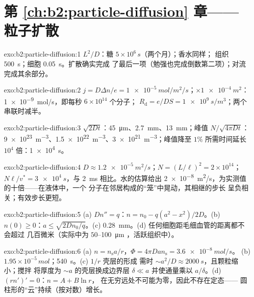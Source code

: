 \section*{第 \ref{ch:b2:particle-diffusion} 章——粒子扩散}

\begin{solution}{exo:b2:particle-diffusion:1}
$L^2/D$：糖 $5 \times 10^6\,\unit{s}$（两个月）；香水同样；
组织 \qty{500}{s}；细胞 \qty{0.05}{s}。扩散确实完成
了最后一项（勉强也完成倒数第二项）；对流完成其余部分。
\end{solution}

\begin{solution}{exo:b2:particle-diffusion:2}
$j = D\Delta n/e = \qty{1e-5}{mol/m^2/s}$；$\times \qty{1e-4}{m^2}$：
\qty{1e-9}{mol/s}，即每秒 $6 \times 10^{14}$ 个分子；
$R_{\text{d}} = e/DS = \qty{1e9}{s/m^3}$；两个串联时减半。
\end{solution}

\begin{solution}{exo:b2:particle-diffusion:3}
$\sqrt{2Dt}$：\qty{45}{\micro m}、\qty{2.7}{mm}、\qty{13}{mm}；峰值 $N/\sqrt{4\pi
Dt}$：\qty{9e23}{m^{-3}}、\qty{1.5e22}{m^{-3}}、\qty{3e21}{m^{-3}}；峰值降至 $1\%$
所需时间延长 $10^4$ 倍：\qty{1e4}{s}。
\end{solution}

\begin{solution}{exo:b2:particle-diffusion:4}
$D \approx \qty{1.2e-5}{m^2/s}$；$N = (L/\ell)^2 = 2 \times 10^{14}$；$N\ell/v^*
= \qty{3e4}{s}$，与 \qty{2}{ms} 相比。水的估算给出
\qty{2e-8}{m^2/s}，为实测值的十倍——在液体中，一个
分子在邻居构成的“笼”中晃动，其相继的步长
呈负相关；有效步长更短。
\end{solution}

\begin{solution}{exo:b2:particle-diffusion:5}
(a) $Dn'' = q$：$n = n_0 - q(a^2 - x^2)/2D$。(b) $n(0) \ge 0$：$a \le
\sqrt{2Dn_0/q}$。(c) \qty{0.28}{mm}。(d) 任何细胞距毛细血管的距离都不会超过
几百微米（实际中为 $50$--\qty{100}{\micro m}
，活跃组织中）。
\end{solution}

\begin{solution}{exo:b2:particle-diffusion:6}
(a) $n = n_{\text{s}}a/r$，$\Phi = 4\pi D a n_{\text{s}} = \qty{3.6e-8}{mol/s}$。
(b) $1.95 \times 10^{-5}\,\unit{mol}$；\qty{540}{s}。(c) $1/r$ 壳层的形成
需时 $\sim a^2/D \approx \qty{2000}{s}$，且颗粒缩小；搅拌
将厚度为 $\sim a$ 的壳层换成边界层 $\delta \ll a$
并使通量乘以 $a/\delta$。(d) $(rn')' = 0$：$n = A + B\ln r$，
在无穷远处不可能为零，因此不存在定态——
圆柱形的“云”持续（按对数）增长。
\end{solution}

